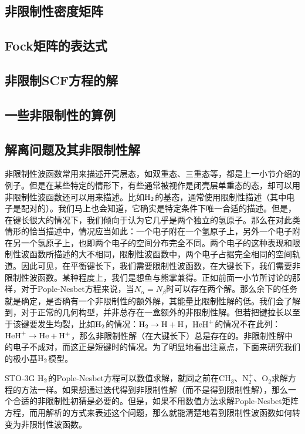 {\subsection{非限制性密度矩阵}
\subsection{Fock矩阵的表达式}
\subsection{非限制SCF方程的解}
\subsection{一些非限制性的算例}


\subsection{解离问题及其非限制性解}
非限制性波函数常用来描述开壳层态，如双重态、三重态等，都是上一小节介绍的例子。但是在某些特定的情形下，有些通常被视作是闭壳层单重态的态，却可以用非限制性波函数还可以用来描述。比如$\mathrm{H}_2$的基态，通常使用限制性描述（其中电子是配对的）。我们马上也会知道，它确实是特定条件下唯一合适的\hft 描述。但是，在键长很大的情况下，我们倾向于认为它几乎是两个独立的氢原子。那么在对此类情形的恰当描述中，情况应当如此：一个电子附在一个氢原子上，另外一个电子附在另一个氢原子上，也即两个电子的空间分布完全不同。两个电子的这种表现和限制性波函数所描述的大不相同，限制性波函数中，两个电子占据完全相同的空间轨道。因此可见，在平衡键长下，我们需要限制性波函数，在大键长下，我们需要非限制性波函数。某种程度上，我们是想鱼与熊掌兼得。正如前面一小节所讨论的那样，对于Pople-Nesbet方程来说，当$N_\alpha=N_\beta$时可以存在两个解。那么余下的任务就是确定，是否确有一个非限制性的额外解，其能量比限制性解的低。我们会了解到，对于正常的几何构型，并非总存在一盒额外的非限制性解。但若把键拉长以至于该键要发生均裂，比如$\mathrm{H}_2$的情况：$\mathrm{H}_2\to \mathrm{H+H}$，$\mathrm{HeH}^+$的情况不在此列：$\mathrm{HeH}^+\to \mathrm{He+H^+}$，那么非限制性解（在大键长下）总是存在的。非限制性解中的电子不成对，而这正是短键时的情况。为了明显地看出注意点，下面来研究我们的极小基$\mathrm{H}_2$模型。

STO-3G $\mathrm{H}_2$的Pople-Nesbet方程可以数值求解，就同之前在$\mathrm{CH_3}$、$\mathrm{N_2^+}$、$\mathrm{O_2}$求解方程的方法一样。如果想通过迭代得到非限制性解（而不是得到限制性解），那么一个合适的非限制性初猜是必要的。但是，如果不用数值方法求解Pople-Nesbet矩阵方程，而用解析的方式来表述这个问题，那么就能清楚地看到限制性波函数如何转变为非限制性波函数。

}
